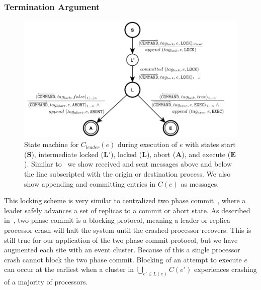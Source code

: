 \documentclass{article}
\begin{document}
	\subsubsection*{Termination Argument}

	\begin{figure}[t]
  	\includegraphics[width=\textwidth]{figures/raft-2pc.pdf}
	  \caption{State machine for $C_{leader}(e)$ during execution of $e$ with states start ($\bm{S}$), intermediate locked ($\bm{L}'$), locked ($\bm{L}$), abort ($\bm{A}$), and execute ($\bm{E}$). Similar to~\cite{skeen_nonblocking_1981} we show received and sent messages above and below the line subscripted with the origin or destination process. We also show appending and committing entries in $C(e)$ as messages.}
	  \label{fig:raft-2pc}
	\end{figure}

	This locking scheme is very similar to centralized two phase commit~\cite{skeen_nonblocking_1981}, where a leader safely advances a set of replicas to a commit or abort state.
	As described in~\cite{skeen_nonblocking_1981}, two phase commit is a blocking protocol, meaning a leader or replica processor crash will halt the system until the crashed processor recovers.
	This is still true for our application of the two phase commit protocol, but we have augmented each site with an event cluster.
	Because of this a single processor crash cannot block the two phase commit.
	Blocking of an attempt to execute $e$ can occur at the earliest when a cluster in $\bigcup_{e' \in L(e)} C(e')$ experiences crashing of a majority of processors.
\end{document}
